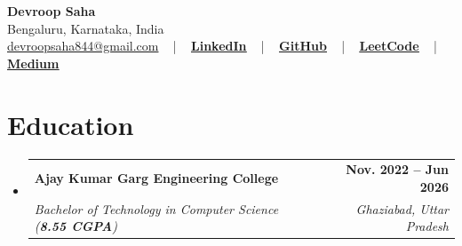\documentclass[letterpaper,11pt]{article}
\makeatletter
\newcommand{\resumeSubheading}[4]{%
  \vspace{-3pt}\item
    \begin{tabular*}{1.0\textwidth}[t]{l@{\extracolsep{\fill}}r}
      \textbf{#1} & \textbf{\small #2} \\
      \textit{\small #3} & \textit{\small #4} \\
    \end{tabular*}\vspace{-8pt}}
\newcommand{\resumeSubHeadingListStart}{\begin{itemize}[leftmargin=0.0in, label={}] }
\newcommand{\resumeSubHeadingListEnd}{\end{itemize}}
\makeatother
\begin{document}
\begin{center}
{\Huge \textbf{Devroop Saha}} \\ \vspace{2pt}
Bengaluru, Karnataka, India \\ \vspace{2pt}
\small \href{mailto:devroopsaha844@gmail.com}{devroopsaha844@gmail.com} ~ | ~ 
\underline{\href{https://www.linkedin.com/in/devroop-saha-datafreak/}{\textbf{LinkedIn}}} ~ | ~ 
\underline{\href{https://github.com/devroopsaha744}{\textbf{GitHub}}} ~ | ~ 
\underline{\href{https://leetcode.com/u/bouncy_hufflepuff/}{\textbf{LeetCode}}} ~ | ~
\underline{\href{https://medium.com/@datafreakai}{\textbf{Medium}}}
\end{center}
\vspace{-6pt}

\section{Education}
\resumeSubHeadingListStart
  \resumeSubheading
    {Ajay Kumar Garg Engineering College}{Nov. \textbf{2022} -- Jun \textbf{2026}}
    {Bachelor of Technology in Computer Science (\textbf{8.55 CGPA})}{Ghaziabad, Uttar Pradesh}
\resumeSubHeadingListEnd
\end{document}
